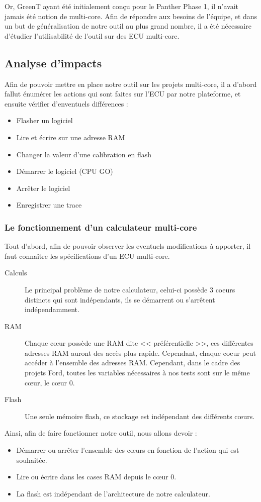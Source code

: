 Or, GreenT ayant été initialement conçu pour le Panther Phase 1, il n'avait jamais été notion de multi-core. Afin de répondre aux besoins de l'équipe, et dans un but de généralisation de notre outil au plus grand nombre, il a été nécessaire d'étudier l'utilisabilité de l'outil sur des ECU multi-core.

\subsection{Analyse d'impacts}\label{analyseimpact}
Afin de pouvoir mettre en place notre outil sur les projets multi-core, il a d'abord fallut énumérer les actions qui sont faites sur l'ECU par notre plateforme, et ensuite vérifier d'enventuels différences : 
\begin{itemize}
	\item Flasher un logiciel
	\item Lire et écrire sur une adresse RAM
	\item Changer la valeur d'une calibration en flash
	\item Démarrer le logiciel (CPU GO)
	\item Arrêter le logiciel
	\item Enregistrer une trace
\end{itemize}


\subsubsection{Le fonctionnement d'un calculateur multi-core}
Tout d'abord, afin de pouvoir observer les eventuels modifications à apporter, il faut connaître les spécifications d'un ECU multi-core. 
\begin{description}
	\item[Calculs] Le principal problème de notre calculateur, celui-ci possède 3 coeurs distincts qui sont indépendants, ils se démarrent ou s'arrêtent indépendamment. 
	\item[RAM] Chaque c\oe{}ur possède une RAM dite << préférentielle >>, ces différentes adresses RAM auront des accès plus rapide. Cependant, chaque coeur peut accéder à l'ensemble des adresses RAM. Cependant, dans le cadre des projets Ford, toutes les variables nécessaires à nos tests sont sur le même c\oe{}ur, le c\oe{}ur 0. 
	\item[Flash] Une seule mémoire flash, ce stockage est indépendant des différents c\oe{}urs. 
\end{description}

Ainsi, afin de faire fonctionner notre outil, nous allons devoir : 
\begin{itemize}
	\item Démarrer ou arrêter l'ensemble des c\oe{}urs en fonction de l'action qui est souhaitée.
	\item Lire ou écrire dans les cases RAM depuis le c\oe{}ur 0.
	\item La flash est indépendant de l'architecture de notre calculateur.
\end{itemize}


